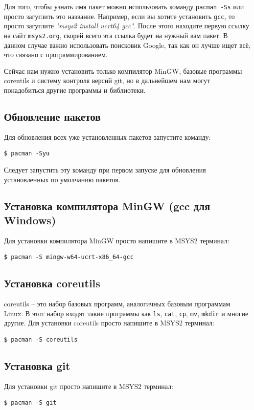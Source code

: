 \documentclass{article}
\begin{document}
\noindent Для того, чтобы узнать имя пакет можно использовать команду \texttt{pacman -Ss} или просто загуглить это название. Например, если вы хотите установить \texttt{gcc}, то просто загуглите \textit{"msys2 install ucrt64 gcc"}. После этого находите первую ссылку на сайт \texttt{msys2.org}, скорей всего эта ссылка будет на нужный вам пакет. В данном случае важно использовать поисковик Google, так как он лучше ищет всё, что связано с программированием.

Сейчас нам нужно установить только компилятор MinGW, базовые программы coreutils и систему контроля версий git, но в дальнейшем нам могут понадобиться другие программы и библиотеки.

\subsection*{Обновление пакетов}
Для обновления всех уже установленных пакетов запустите команду:
\begin{lstlisting}[style=csMiptBash]
$ pacman -Syu
\end{lstlisting}
Следует запустить эту команду при первом запуске для обновления установленных по умолчанию пакетов.

\subsection*{Установка компилятора MinGW (gcc для Windows)}
Для установки компилятора MinGW просто напишите в MSYS2 терминал:
\begin{lstlisting}[style=csMiptBash]
$ pacman -S mingw-w64-ucrt-x86_64-gcc
\end{lstlisting}

\subsection*{Установка coreutils}
coreutils -- это набор базовых программ, аналогичных базовым программам Linux. В этот набор входят такие программы как \texttt{ls}, \texttt{cat}, \texttt{cp}, \texttt{mv}, \texttt{mkdir} и многие другие. Для установки coreutils просто напишите в MSYS2 терминал:
\begin{lstlisting}[style=csMiptBash]
$ pacman -S coreutils
\end{lstlisting}

\subsection*{Установка git}
Для установки git просто напишите в MSYS2 терминал:
\begin{lstlisting}[style=csMiptBash]
$ pacman -S git
\end{lstlisting}
\end{document}
